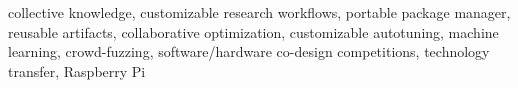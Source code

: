collective knowledge,
customizable research workflows,
portable package manager,
reusable artifacts,
collaborative optimization,
customizable autotuning,
machine learning,
crowd-fuzzing,
software/hardware co-design competitions, 
technology transfer,
Raspberry Pi
